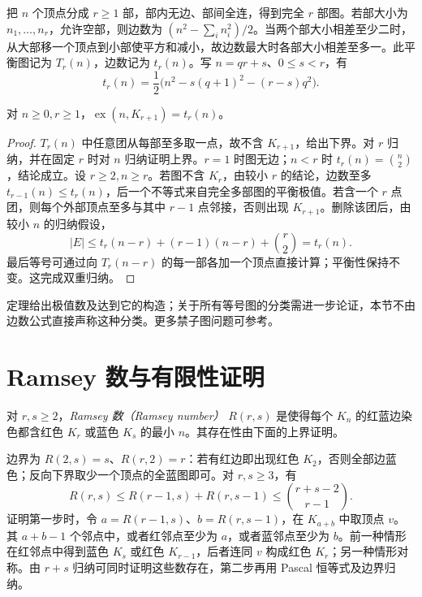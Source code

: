 把 $n$ 个顶点分成 $r\ge1$ 部，部内无边、部间全连，得到完全 $r$ 部图。若部大小为 $n_1,\ldots,n_r$，允许空部，则边数为 $(n^2-\sum_i n_i^2)/2$。当两个部大小相差至少二时，从大部移一个顶点到小部使平方和减小，故边数最大时各部大小相差至多一。此平衡图记为 $T_r(n)$，边数记为 $t_r(n)$。写 $n=qr+s$、$0\le s<r$，有
\[
 t_r(n)=\frac12\bigl(n^2-s(q+1)^2-(r-s)q^2\bigr).
\]

\begin{theorem}[Tur\'an 定理]
对 $n\ge0,r\ge1$，$\operatorname{ex}(n,K_{r+1})=t_r(n)$。
\end{theorem}
\begin{proof}
$T_r(n)$ 中任意团从每部至多取一点，故不含 $K_{r+1}$，给出下界。对 $r$ 归纳，并在固定 $r$ 时对 $n$ 归纳证明上界。$r=1$ 时图无边；$n<r$ 时 $t_r(n)=\binom n2$，结论成立。设 $r\ge2,n\ge r$。若图不含 $K_r$，由较小 $r$ 的结论，边数至多 $t_{r-1}(n)\le t_r(n)$，后一个不等式来自完全多部图的平衡极值。若含一个 $r$ 点团，则每个外部顶点至多与其中 $r-1$ 点邻接，否则出现 $K_{r+1}$。删除该团后，由较小 $n$ 的归纳假设，
\[
 |E|\le t_r(n-r)+(r-1)(n-r)+\binom r2=t_r(n).
\]
最后等号可通过向 $T_r(n-r)$ 的每一部各加一个顶点直接计算；平衡性保持不变。这完成双重归纳。
\end{proof}

定理给出极值数及达到它的构造；关于所有等号图的分类需进一步论证，本节不由边数公式直接声称这种分类。更多禁子图问题可参考\cite{zhao-graph-notes}。

\section{Ramsey 数与有限性证明}

\begin{definition}
对 $r,s\ge2$，\emph{Ramsey 数（Ramsey number）} $R(r,s)$ 是使得每个 $K_n$ 的红蓝边染色都含红色 $K_r$ 或蓝色 $K_s$ 的最小 $n$。其存在性由下面的上界证明。
\end{definition}

边界为 $R(2,s)=s$、$R(r,2)=r$：若有红边即出现红色 $K_2$，否则全部边蓝色；反向下界取少一个顶点的全蓝图即可。对 $r,s\ge3$，有
\begin{equation}
 R(r,s)\le R(r-1,s)+R(r,s-1)
       \le\binom{r+s-2}{r-1}.
 \label{eq:ramsey-recursion}
\end{equation}
证明第一步时，令 $a=R(r-1,s)$、$b=R(r,s-1)$，在 $K_{a+b}$ 中取顶点 $v$。其 $a+b-1$ 个邻点中，或者红邻点至少为 $a$，或者蓝邻点至少为 $b$。前一种情形在红邻点中得到蓝色 $K_s$ 或红色 $K_{r-1}$，后者连同 $v$ 构成红色 $K_r$；另一种情形对称。由 $r+s$ 归纳可同时证明这些数存在，第二步再用 Pascal 恒等式及边界归纳。

